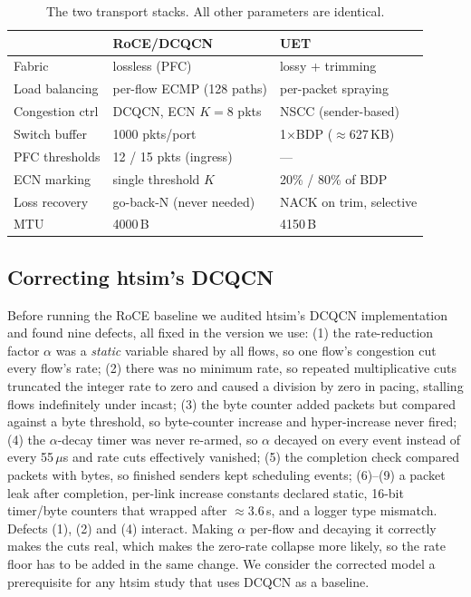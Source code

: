 \documentclass[conference]{IEEEtran}
\begin{document}
\begin{table}[t]
\centering
\caption{The two transport stacks. All other parameters are identical.}
\label{tab:stacks}
\footnotesize
\setlength{\tabcolsep}{4pt}
\begin{tabular}{@{}lll@{}}
\toprule
 & \textbf{RoCE/DCQCN} & \textbf{UET} \\
\midrule
Fabric          & lossless (PFC)            & lossy + trimming \\
Load balancing  & per-flow ECMP (128 paths) & per-packet spraying \\
Congestion ctrl & DCQCN, ECN $K{=}8$ pkts   & NSCC (sender-based) \\
Switch buffer   & 1000 pkts/port            & 1$\times$BDP ($\approx$627\,KB) \\
PFC thresholds  & 12 / 15 pkts (ingress)    & --- \\
ECN marking     & single threshold $K$      & 20\% / 80\% of BDP \\
Loss recovery   & go-back-N (never needed)  & NACK on trim, selective \\
MTU             & 4000\,B                   & 4150\,B \\
\bottomrule
\end{tabular}
\end{table}

\subsection{Correcting htsim's DCQCN}
\label{sec:dcqcn}
Before running the RoCE baseline we audited htsim's DCQCN implementation and
found nine defects, all fixed in the version we use:
(1) the rate-reduction factor $\alpha$ was a \emph{static} variable shared by
all flows, so one flow's congestion cut every flow's rate;
(2) there was no minimum rate, so repeated multiplicative cuts truncated the
integer rate to zero and caused a division by zero in pacing, stalling flows
indefinitely under incast;
(3) the byte counter added packets but compared against a byte threshold, so
byte-counter increase and hyper-increase never fired;
(4) the $\alpha$-decay timer was never re-armed, so $\alpha$ decayed on every
event instead of every 55\,$\mu$s and rate cuts effectively vanished;
(5) the completion check compared packets with bytes, so finished senders kept
scheduling events;
(6)--(9) a packet leak after completion, per-link increase constants declared
static, 16-bit timer/byte counters that wrapped after $\approx$3.6\,s, and a
logger type mismatch.
Defects (1), (2) and (4) interact. Making $\alpha$ per-flow and decaying it
correctly makes the cuts real, which makes the zero-rate collapse more likely,
so the rate floor has to be added in the same change. We consider the corrected
model a prerequisite for any htsim study that uses DCQCN as a baseline.
\end{document}
